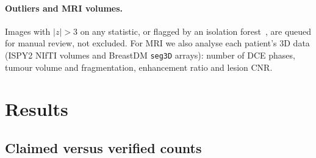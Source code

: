 \documentclass[11pt]{article}
\begin{document}
\paragraph{Outliers and MRI volumes.} Images with $|z|>3$ on any statistic,
or flagged by an isolation forest~\citep{liu2008iforest}, are queued for
manual review, not excluded. For MRI we also analyse each patient's 3D data
(ISPY2 NIfTI volumes and BreastDM \texttt{seg3D} arrays): number of DCE phases,
tumour volume and fragmentation, enhancement ratio and lesion CNR.

\section{Results}
\label{sec:results}

\subsection{Claimed versus verified counts}

\begin{table}[!htbp]
  \centering
  \small
  \caption{Reported counts, what is on disk, and what the training loader uses. Groups are patients or cases, where the dataset provides an identifier.}
  \label{tab:counts}
\end{table}
\end{document}
